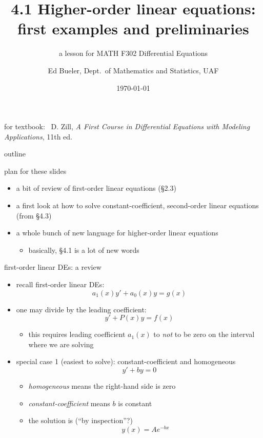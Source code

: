 \documentclass{beamer}
\title{4.1 Higher-order linear equations: \\ first examples and preliminaries}
\subtitle{a lesson for MATH F302 Differential Equations}
\author{Ed Bueler, Dept.~of Mathematics and Statistics, UAF}
\date{\tiny \today}
\begin{document}


\begin{frame}
\titlepage

\centerline{\tiny for textbook: \, D. Zill, \emph{A First Course in Differential Equations with Modeling Applications}, 11th ed.}
\end{frame}


\begin{frame}{outline}

plan for these slides
\begin{itemize}
\item a bit of review of first-order linear equations (\S2.3)
\item a first look at how to solve constant-coefficient, second-order linear equations (from \S4.3)
\item a whole bunch of new language for higher-order linear equations
    \begin{itemize}
    \item basically, \S4.1 is a lot of new words
    \end{itemize}
\end{itemize}
\end{frame}


\begin{frame}{first-order linear DEs: a review}

\begin{itemize}
\item recall first-order linear DEs:
    $$a_1(x) y' + a_0(x) y = g(x)$$
\item one may divide by the leading coefficient:
    $$y' + P(x) y = f(x)$$

    \begin{itemize}
    \item \alert{this requires leading coefficient $a_1(x)$ to \emph{not} to be zero} on the interval where we are solving
    \end{itemize}
\item special case 1 (\alert{easiest to solve}): constant-coefficient and homogeneous
    $$y' + b y = 0$$

    \begin{itemize}
    \item \emph{homogeneous} means the right-hand side is zero
    \item \emph{constant-coefficient} means $b$ is constant
    \item the solution is (``by inspection''?)
        $$y(x) = A e^{-bx}$$
    \end{itemize}
\end{itemize}
\end{frame}
\end{document}
